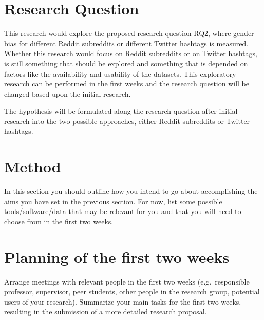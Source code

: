 \documentclass[english, a4paper, 11pt]{article}
\begin{document}
\section*{Research Question}
This research would explore the proposed research question RQ2, where gender bias for different Reddit subreddits or different Twitter hashtags is measured. Whether this research
would focus on Reddit subreddits or on Twitter hashtags, is still something that should be
explored and something that is depended on factors like the availability and usability of
the datasets. This exploratory research can be performed in the first weeks and the
research question will be changed based upon the initial research.

The hypothesis will be formulated along the research question after initial research into
the two possible approaches, either Reddit subreddits or Twitter hashtags.

\section*{Method}
In this section you should outline how you intend to go about accomplishing the aims you have set in the previous section. 
For now, list some possible tools/software/data that may be relevant for you and that you will need to choose from in the first two weeks.

\section*{Planning of the first two weeks}
Arrange meetings with relevant people in the first two weeks (e.g.\ responsible professor, supervisor, peer students, other people in the research group, potential users of your research).
Summarize your main tasks for the first two weeks, resulting in the submission of a more detailed research proposal.

\printbibliography
\end{document}
